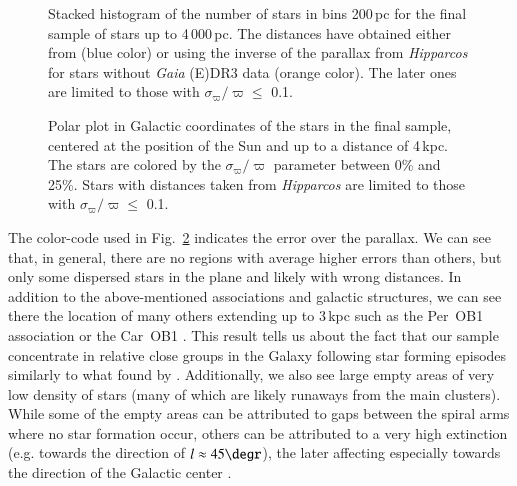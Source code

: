 \documentclass{aa}
\begin{document}
\begin{figure}[!t]
\centering
{}
\caption{Stacked histogram of the number of stars in bins 200\,pc for the final sample of stars up to 4\,000\,pc. The distances have obtained either from \citet{2021AJ....161..147B} (blue color) or using the inverse of the parallax from \textit{Hipparcos} for stars without {\it Gaia} (E)DR3 data (orange color). The later ones are limited to those with $\sigma_{\varpi}/\varpi \leq$ 0.1.}
\label{fig:hist_dist}
\end{figure}

\begin{figure}[t!]
\centering
{}
\caption{Polar plot in Galactic coordinates of the stars in the final sample, centered at the position of the Sun and up to a distance of 4\,kpc. The stars are colored by the $\sigma_{\varpi}/\varpi$ parameter between 0\% and 25\%. Stars with distances taken from \textit{Hipparcos} are limited to those with $\sigma_{\varpi}/\varpi \leq$ 0.1.}
\label{fig:gaia_lb}
\end{figure}

The color-code used in Fig.~\ref{fig:gaia_lb} indicates the error over the parallax. We can see that, in general, there are no regions with average higher errors than others, but only some dispersed stars in the plane and likely with wrong distances. In addition to the above-mentioned associations and galactic structures, we can see there the location of many others extending up to 3\,kpc such as the Per~OB1 association \citep[$l\approx130\degr$, $d\approx$\,2\,400\,$\pm$\,200\,pc,][]{1992A&AS...94..211G,2020A&A...643A.116D,2020Ap&SS.365..112M} or the Car~OB1 \citep[$l\approx300\degr$, $d\approx$\,2\,300\,pc,][]{2021ApJ...914...18S}. This result tells us about the fact that our sample concentrate in relative close groups in the Galaxy following star forming episodes similarly to what found by \citet[][Figure 5]{2021MNRAS.504.2968P}. Additionally, we also see large empty areas of very low density of stars (many of which are likely runaways from the main clusters). While some of the empty areas can be attributed to gaps between the spiral arms where no star formation occur, others can be attributed to a very high extinction (e.g. towards the direction of $l\approx45\degr$), the later affecting especially towards the direction of the Galactic center \citep[see][]{2018A&A...616A.132L,2019A&A...625A.135L}.
\end{document}
